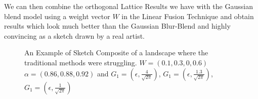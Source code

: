 \documentclass{article}
\begin{document}
We can then combine the orthogonal Lattice Results we have with the Gaussian blend model using a weight vector $W$ in the Linear Fusion Technique and obtain results which look much better than the Gaussian Blur-Blend and highly convincing as a sketch drawn by a real artist.

\begin{figure}[ht]
    \centering
    \caption{\centering An Example of Sketch Composite of a landscape where the traditional methods were struggling. $W = (0.1, 0.3, 0, 0.6)$ $\alpha = (0.86, 0.88, 0.92)$ and $G_1 = (\epsilon, \frac{4}{\sqrt{2 \pi}})$, $G_1 = (\epsilon, \frac{1.3}{\sqrt{2 \pi}})$, $G_1 = (\epsilon, \frac{1}{\sqrt{2 \pi}})$\label{fig:swiss-1-novel}}
\end{figure}
\end{document}
